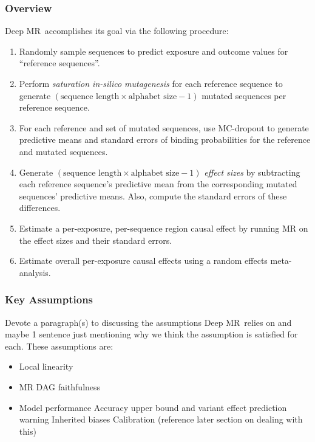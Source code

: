 \documentclass[twoside,11pt]{article}
\newcommand{\method}{{Deep MR}}
\begin{document}
\subsubsection{Overview}%
\method\ accomplishes its goal via the following procedure: 
\label{ssub:algo_overview}
\begin{enumerate}
    \item Randomly sample sequences to predict exposure and outcome values for ``reference sequences''.
    \item Perform \textit{saturation in-silico mutagenesis} for each reference sequence to generate \( (\text{sequence\ length} \times \text{alphabet\ size} - 1) \) mutated sequences per reference sequence.
    \item For each reference and set of mutated sequences, use MC-dropout \cite{gal2016dropout} to generate predictive means and standard errors of binding probabilities for the reference and mutated sequences.
    \item Generate \( (\text{sequence length} \times \text{alphabet size} - 1) \) \textit{effect sizes} by subtracting each reference sequence's predictive mean from the corresponding mutated sequences' predictive means. Also, compute the standard errors of these differences.
    \item Estimate a per-exposure, per-sequence region causal effect by running MR on the effect sizes and their standard errors.
    \item Estimate overall per-exposure causal effects using a random effects meta-analysis.
\end{enumerate}

\subsubsection{Key Assumptions}%
\label{ssub:key_assumptions}
Devote a paragraph(s) to discussing the assumptions \method\ relies on and maybe 1 sentence just mentioning why we think the assumption is satisfied for each. These assumptions are:
\begin{itemize}
	\item Local linearity
	\item MR DAG faithfulness
	\item Model performance
		\subitem Accuracy upper bound and variant effect prediction warning
		\subitem Inherited biases
		\subitem Calibration (reference later section on dealing with this)
\end{itemize}
\end{document}
